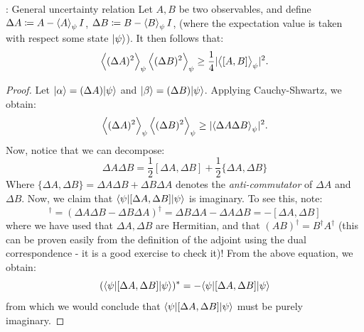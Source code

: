 \begin{thmbox}{: General uncertainty relation}
    Let $A, B$ be two observables, and define $\Delta A \coloneqq A - \left< A \right>_\psi I$, $\Delta B \coloneqq B - \left< B \right>_\psi I$, (where the expectation value is taken with respect some state $\lvert \psi \rangle$). It then follows that:
    \begin{equation}
        \left< (\Delta A)^2 \right>_\psi\left< (\Delta B)^2 \right>_\psi \geq \frac{1}{4}\lvert \left< [A, B] \right>_\psi \rvert^2.
    \end{equation}
\end{thmbox}
\begin{proof}
    Let $\lvert \alpha \rangle = (\Delta A)\lvert \psi \rangle$ and $\lvert \beta \rangle = (\Delta B)\lvert \psi \rangle$. Applying Cauchy-Shwartz, we obtain:
    \begin{equation}\label{eq-CSapplied}
        \left< (\Delta A)^2 \right>_\psi\left< (\Delta B)^2 \right>_\psi \geq \lvert \left< \Delta A\Delta B \right>_\psi \rvert^2.
    \end{equation}
    Now, notice that we can decompose:
    \begin{equation}
        \Delta A \Delta B = \frac{1}{2}[\Delta A, \Delta B] + \frac{1}{2}\{\Delta A, \Delta B \}
    \end{equation}
    Where $\{\Delta A, \Delta B\} = \Delta A\Delta B + \Delta B\Delta A$ denotes the \emph{anti-commutator} of $\Delta A$ and $\Delta B$. Now, we claim that $\langle \psi \rvert[\Delta A, \Delta B]\lvert \psi \rangle$ is imaginary. To see this, note:
    \begin{equation}
        [\Delta A, \Delta B]^\dag = (\Delta A \Delta B - \Delta B \Delta A)^\dag = \Delta B \Delta A - \Delta A \Delta B = -[\Delta A, \Delta B]
    \end{equation}
    where we have used that $\Delta A, \Delta B$ are Hermitian, and that $(AB)^\dag = B^\dag A^\dag$ (this can be proven easily from the definition of the adjoint using the dual correspondence - it is a good exercise to check it)! From the above equation, we obtain:
    \begin{equation}
        (\langle \psi \rvert[\Delta A, \Delta B]\lvert \psi \rangle)^* = -\langle \psi \rvert[\Delta A, \Delta B]\lvert \psi \rangle
    \end{equation}
    from which we would conclude that $\langle \psi \rvert[\Delta A, \Delta B]\lvert \psi \rangle$ must be purely imaginary. 


\end{proof}
